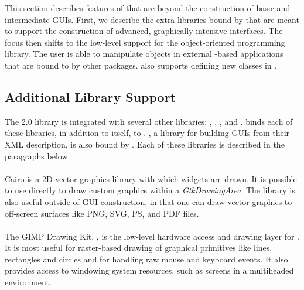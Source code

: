 \documentclass[article]{jss}
\begin{document}
This section describes features of  that are beyond the construction
of basic and intermediate GUIs. First, we describe the extra libraries bound
by  that are meant to support the construction of advanced,
graphically-intensive interfaces. The focus then shifts to the low-level support 
for the  object-oriented programming library. The 
user is able to manipulate
objects in external -based applications that are bound to 
by other packages.  also supports defining new  classes 
in .

\subsection{Additional Library Support}

The  2.0 library is integrated with several other libraries: , 
, ,  and . 
 binds each of these libraries, in addition to  itself, to .
, a library for building GUIs from their XML description, is
also bound by . Each of these libraries is described in the paragraphs below. 

\paragraph[Cairo]{} 

Cairo is a 2D vector graphics library with 
which  widgets are drawn. It is possible to use  directly 
to draw custom graphics within a \emph{GtkDrawingArea}. The library is also 
useful outside of GUI construction, in that one can draw vector graphics to 
off-screen surfaces like PNG, SVG, PS, and PDF files. 

\paragraph[GDK]{}

The GIMP Drawing Kit, , is the low-level hardware access and drawing layer 
for . It is most useful for raster-based drawing of graphical 
primitives like lines, rectangles and circles and for handling raw mouse and 
keyboard events. It also provides access to windowing system resources, such
as screens in a multiheaded environment.

\paragraph[GdkPixbuf]{}
\end{document}
